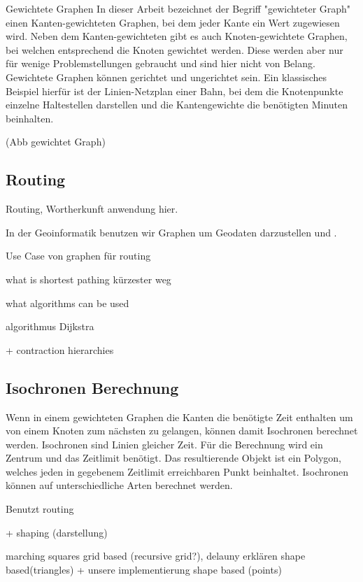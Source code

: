 \documentclass[10pt,a4paper]{article}
\begin{document}
Gewichtete Graphen
In dieser Arbeit bezeichnet der Begriff "gewichteter Graph" einen Kanten-gewichteten Graphen, bei dem jeder Kante ein Wert 
zugewiesen wird. Neben dem Kanten-gewichteten gibt es auch Knoten-gewichtete Graphen, bei welchen entsprechend die Knoten gewichtet werden. Diese werden aber nur für wenige Problemstellungen gebraucht und sind hier nicht von Belang. Gewichtete Graphen können gerichtet und ungerichtet sein. Ein klassisches Beispiel hierfür ist der Linien-Netzplan einer Bahn, bei dem die Knotenpunkte einzelne Haltestellen darstellen und die Kantengewichte die benötigten Minuten beinhalten.

(Abb gewichtet Graph)



\subsection{Routing}

Routing, Wortherkunft anwendung hier.

In der Geoinformatik benutzen wir Graphen um Geodaten darzustellen und . 

Use Case von graphen für routing

what is shortest pathing
kürzester weg 

what algorithms can be used

algorithmus Dijkstra 

+ contraction hierarchies

\subsection{Isochronen Berechnung}

Wenn in einem gewichteten Graphen die Kanten die benötigte Zeit enthalten um von einem Knoten zum nächsten zu gelangen, können damit Isochronen berechnet werden.
Isochronen sind Linien gleicher Zeit. Für die Berechnung wird ein Zentrum und das Zeitlimit benötigt. Das resultierende Objekt ist ein Polygon, welches jeden in gegebenem Zeitlimit erreichbaren Punkt beinhaltet.
Isochronen können auf unterschiedliche Arten berechnet werden. 

Benutzt routing

+ shaping (darstellung)

marching squares grid based (recursive grid?), delauny erklären shape based(triangles) + unsere implementierung shape based (points)
\end{document}
